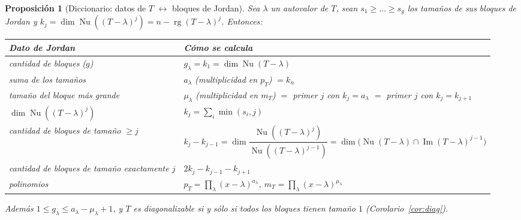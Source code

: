 \documentclass{article}
\DeclareMathOperator{\Ima}{Im}
\DeclareMathOperator{\rg}{rg}
\DeclareMathOperator{\Nu}{Nu}
\theoremstyle{plain}
\newtheorem{proposicion}[teorema]{Proposición}
\theoremstyle{definition}
\theoremstyle{remark}
\begin{document}
\begin{proposicion}[Diccionario: datos de \(T\) \(\leftrightarrow\) bloques de Jordan]\label{prop:dicc}
    Sea \(\lambda\) un autovalor de \(T\), sean \(s_1\ge\dots\ge s_g\) los tamaños de sus bloques de Jordan y \(k_j=\dim\Nu((T-\lambda)^j)=n-\rg(T-\lambda)^j\). Entonces:

    \begin{center}
        \renewcommand{\arraystretch}{1.35}
        \begin{tabular}{@{}p{6.2cm}p{9.6cm}@{}}
            \toprule
            \textbf{Dato de Jordan}                         & \textbf{Cómo se calcula}                                                                                                     \\
            \midrule
            cantidad de bloques (\(g\))                     & \(g_\lambda=k_1=\dim\Nu(T-\lambda)\)                                                                                         \\
            suma de los tamaños                             & \(a_\lambda\) (multiplicidad en \(p_T\)) \(=k_n\)                                                                            \\
            tamaño del bloque más grande                    & \(\mu_\lambda\) (multiplicidad en \(m_T\)) \(=\) primer \(j\) con \(k_j=a_\lambda\) \(=\) primer \(j\) con \(k_j=k_{j+1}\)   \\
            \(\dim\Nu((T-\lambda)^j)\)                      & \(k_j=\sum_i\min(s_i,j)\)                                                                                                    \\
            cantidad de bloques de tamaño \(\ge j\)         & \(k_j-k_{j-1}=\dim\dfrac{\Nu((T-\lambda)^j)}{\Nu((T-\lambda)^{j-1})}=\dim\big(\Nu(T-\lambda)\cap\Ima(T-\lambda)^{j-1}\big)\) \\
            cantidad de bloques de tamaño exactamente \(j\) & \(2k_j-k_{j-1}-k_{j+1}\)                                                                                                     \\
            polinomios                                      & \(p_T=\prod_\lambda(x-\lambda)^{a_\lambda}\), \quad \(m_T=\prod_\lambda(x-\lambda)^{\mu_\lambda}\)                           \\
            \bottomrule
        \end{tabular}
    \end{center}
    Además \(1\le g_\lambda\le a_\lambda-\mu_\lambda+1\), y \(T\) es diagonalizable si y sólo si todos los bloques tienen tamaño \(1\) (Corolario~\ref{cor:diag}).
\end{proposicion}
\end{document}
